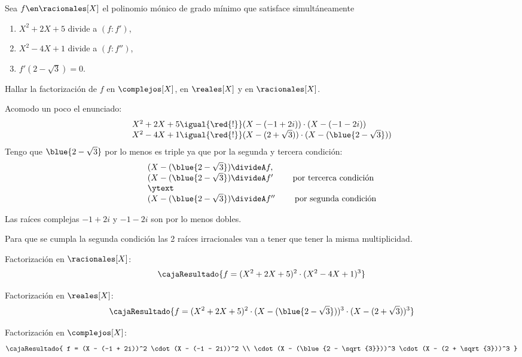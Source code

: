 \begin{enunciado}{\ejExtra}
  Sea $f \en \racionales[X]$ el polinomio mónico de grado mínimo que satisface simultáneamente
  \begin{enumerate}[label={\tiny $\blacksquare$}]
    \item $X^2 + 2X + 5$ divide a $(f:f')$,
    \item $X^2 - 4X + 1$ divide a $(f:f'')$,
    \item $f'(2-\sqrt{3}) = 0$.
  \end{enumerate}
  Hallar la factorización de $f$ en $\complejos[X]$, en $\reales[X]$ y en $\racionales[X]$.
\end{enunciado}

Acomodo un poco el enunciado:
$$
  \begin{array}{l}
    X^2 + 2X + 5
    \igual{\red{!}}
    (X - (-1 + 2i)) \cdot (X - (-1 - 2i))                  \\
    X^2 -4 X + 1
    \igual{\red{!}}
    (X - (2 + \sqrt{3})) \cdot (X - (\blue{2 - \sqrt{3}})) \\
  \end{array}
$$
Tengo que $\blue{2 - \sqrt{3}}$ por lo menos es triple ya que por la segunda y tercera condición:
$$
  \begin{array}{l}
    (X - (\blue{2 - \sqrt{3}}) \divideA f                                        , \\
    (X - (\blue{2 - \sqrt{3}}) \divideA f' \qquad \text{ por tercerca condición}   \\
    \ytext                                                                         \\
    (X - (\blue{2 - \sqrt{3}}) \divideA f'' \qquad \text{ por segunda condición}   \\
  \end{array}
$$

Las raíces complejas $-1 + 2i$ y $-1 - 2i$ son por lo menos dobles.

\bigskip

Para que se cumpla la segunda condición las 2 raíces irracionales van a tener que tener la misma multiplicidad.

\medskip

Factorización en $\racionales[X]$:
$$
  \cajaResultado{
    f =
    (X^2 + 2X + 5)^2
    \cdot
    (X^2 - 4X + 1)^3
  }
$$

Factorización en $\reales[X]$:
$$
  \cajaResultado{
    f =
    (X^2 + 2X + 5)^2
    \cdot
    (X - (\blue{2 - \sqrt{3}}))^3
    \cdot
    (X - (2 + \sqrt{3}))^3
  }
$$

Factorización en $\complejos[X]$:
$$
  \cajaResultado{
    f =
    (X - (-1 + 2i))^2 \cdot (X - (-1 - 2i))^2                  \\
    \cdot
    (X - (\blue{2 - \sqrt{3}}))^3
    \cdot
    (X - (2 + \sqrt{3}))^3
  }
$$
\begin{aportes}
  \item {}
  \item {}
\end{aportes}
